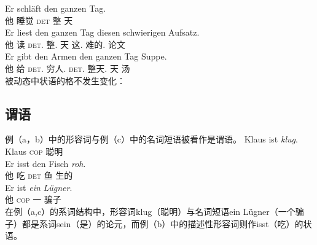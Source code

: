 \eal
\ex 
\gll Er schläft den ganzen Tag.\\
     他 睡觉 \textsc{det} 整 天\\
\ex 
\gll Er liest den ganzen Tag diesen schwierigen Aufsatz.\\
	 他 读 \textsc{det}.\acc{} 整.\acc{} 天 这.\acc{} 难的.\acc{} 论文\\
\ex 
\gll Er gibt den Armen den ganzen Tag Suppe.\\
	 他 给 \textsc{det}.\dat{} 穷人.\dat{} \textsc{det}.\acc{} 整天.\acc{} 天 汤\\
\zl
被动态中状语的格不发生变化：
\eal
{}
\zl
{}

\subsection{谓语}
例（a，b）中的形容词与例（c）中的名词短语被看作是谓语。
\eal
\ex 
\gll Klaus ist \emph{klug}.\\
	 Klaus \textsc{cop} 聪明\\
\ex 
\gll Er isst den Fisch \emph{roh}.\\
	 他 吃 \textsc{det} 鱼 生的\\
\ex 
\gll Er ist \emph{ein} \emph{Lügner}.\\
     他 \textsc{cop} 一 骗子\\
\zl
在例（a,c）的系词结构中，形容词klug（聪明）与名词短语ein Lügner（一个骗子）都是系词sein（是）的论元，而例（b）中的描述性形容词则作isst（吃）的状语。

